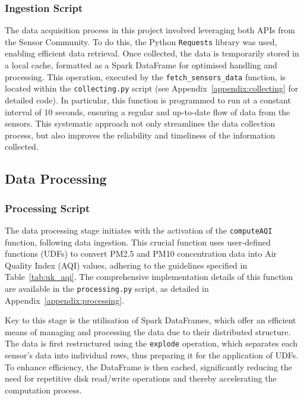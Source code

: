 \documentclass[12pt,oneside]{book} %
\begin{document}
\subsubsection{Ingestion Script}
The data acquisition process in this project involved leveraging both APIs from
the Sensor Community. To do this, the Python \texttt{Requests} library was
used, enabling efficient data retrieval. Once collected, the data is
temporarily stored in a local cache, formatted as a Spark DataFrame for
optimised handling and processing. This operation, executed by the
\texttt{fetch\_sensors\_data} function, is located within the
\texttt{collecting.py} script (see Appendix~\ref{appendix:collecting} for
detailed code). In particular, this function is programmed to run at a constant
interval of 10 seconds, ensuring a regular and up-to-date flow of data from the
sensors. This systematic approach not only streamlines the data collection
process, but also improves the reliability and timeliness of the information
collected.

\subsection{Data Processing}

\subsubsection{Processing Script}
The data processing stage initiates with the activation of the
\texttt{computeAQI} function, following data ingestion. This crucial function
uses user-defined functions (UDFs) to convert PM2.5 and PM10 concentration data
into Air Quality Index (AQI) values, adhering to the guidelines specified in
Table~\ref{tab:uk_aqi}. The comprehensive implementation details of this
function are available in the \texttt{processing.py} script, as detailed in
Appendix~\ref{appendix:processing}.

Key to this stage is the utilisation of Spark DataFrames, which offer an
efficient means of managing and processing the data due to their distributed
structure. The data is first restructured using the \texttt{explode} operation,
which separates each sensor's data into individual rows, thus preparing it for
the application of UDFs. To enhance efficiency, the DataFrame is then cached,
significantly reducing the need for repetitive disk read/write operations and
thereby accelerating the computation process.
\end{document}
